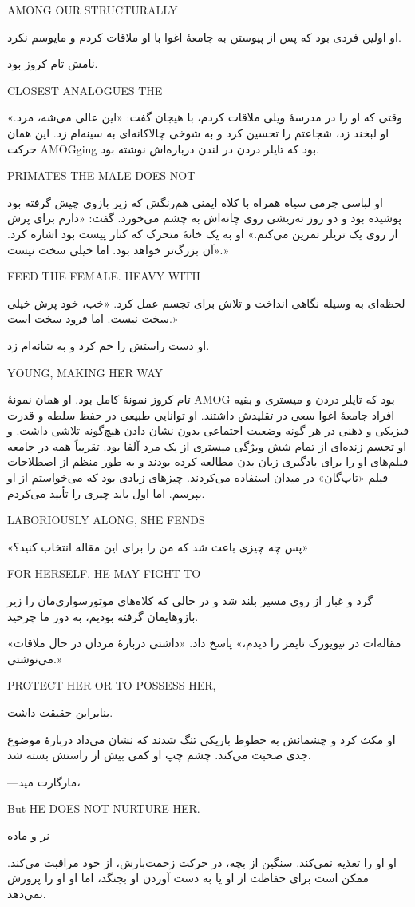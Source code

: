 AMONG OUR STRUCTURALLY

او اولین فردی بود که پس از پیوستن به جامعهٔ اغوا با او ملاقات کردم و مایوسم نکرد.

نامش تام کروز بود.

CLOSEST ANALOGUES THE

وقتی که او را در مدرسهٔ ویلی ملاقات کردم، با هیجان گفت: «این عالی می‌شه، مرد.» او لبخند زد، شجاعتم را تحسین کرد و به شوخی چالاکانه‌ای به سینه‌ام زد. این همان حرکت AMOGging بود که تایلر دردن در لندن درباره‌اش نوشته بود.

PRIMATES THE MALE DOES NOT

او لباسی چرمی سیاه همراه با کلاه ایمنی هم‌رنگش که زیر بازوی چپش گرفته بود پوشیده بود و دو روز ته‌ریشی روی چانه‌اش به چشم می‌خورد. گفت: «دارم برای پرش از روی یک تریلر تمرین می‌کنم.» او به یک خانهٔ متحرک که کنار پیست بود اشاره کرد. «آن بزرگ‌تر خواهد بود. اما خیلی سخت نیست.»

FEED THE FEMALE. HEAVY WITH

لحظه‌ای به وسیله نگاهی انداخت و تلاش برای تجسم عمل کرد. «خب، خود پرش خیلی سخت نیست. اما فرود سخت است.»

او دست راستش را خم کرد و به شانه‌ام زد.

YOUNG, MAKING HER WAY

تام کروز نمونهٔ کامل بود. او همان نمونهٔ AMOG بود که تایلر دردن و میستری و بقیه افراد جامعهٔ اغوا سعی در تقلیدش داشتند. او توانایی طبیعی در حفظ سلطه و قدرت فیزیکی و ذهنی در هر گونه وضعیت اجتماعی بدون نشان دادن هیچ‌گونه تلاشی داشت. و او تجسم زنده‌ای از تمام شش ویژگی میستری از یک مرد آلفا بود. تقریباً همه در جامعه فیلم‌های او را برای یادگیری زبان بدن مطالعه کرده بودند و به طور منظم از اصطلاحات فیلم «تاپ‌گان» در میدان استفاده می‌کردند. چیزهای زیادی بود که می‌خواستم از او بپرسم. اما اول باید چیزی را تأیید می‌کردم.

LABORIOUSLY ALONG, SHE FENDS

«پس چه چیزی باعث شد که من را برای این مقاله انتخاب کنید؟»

FOR HERSELF. HE MAY FIGHT TO

گرد و غبار از روی مسیر بلند شد و در حالی که کلاه‌های موتورسواری‌مان را زیر بازوهایمان گرفته بودیم، به دور ما چرخید.

«مقاله‌ات در نیویورک تایمز را دیدم،» پاسخ داد. «داشتی دربارهٔ مردان در حال ملاقات می‌نوشتی.»

PROTECT HER OR TO POSSESS HER,

بنابراین حقیقت داشت.

او مکث کرد و چشمانش به خطوط باریکی تنگ شدند که نشان می‌داد دربارهٔ موضوع جدی صحبت می‌کند. چشم چپ او کمی بیش از راستش بسته شد.

—مارگارت مید،

But HE DOES NOT NURTURE HER.

نر و ماده

او او را تغذیه نمی‌کند. سنگین از بچه، در حرکت زحمت‌بارش، از خود مراقبت می‌کند. ممکن است برای حفاظت از او یا به دست آوردن او بجنگد، اما او او را پرورش نمی‌دهد.